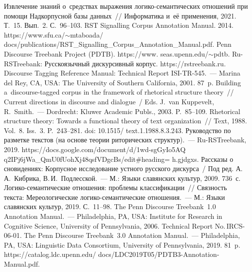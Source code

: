 \begin{multicols}{2}
{\small\frenchspacing
 { %
 \begin{thebibliography}{99}
 
\vspace*{-2pt}
 
 Извлечение знаний о~средствах выражения 
ло\-ги\-ко-се\-ман\-ти\-че\-ских отношений при помощи Надкорпусной базы данных~// Информатика и~её 
применения, 2021. Т.~15. Вып.~2. С.~96--103.
 RST Signalling Corpus Annotation Manual. 2014. {\sf 
https://www.sfu.ca/$\sim$mtaboada/ docs/publications/RST\_Signalling\_Corpus\_Annotation\_\linebreak Manual.pdf}.
Penn Discourse Treebank Project (PDTB). {\sf https://www. seas.upenn.edu/$\sim$pdtb}.
Ru-RSTreebank: Русскоязычный дискурсивный корпус. {\sf https://rstreebank.ru}.
 Discourse Tagging Reference Manual: Technical Report ISI-TR-545.~--- 
Marina del Rey, CA, USA: The University of Southern California, 2001. 87~p.
 Building a~discourse-tagged corpus in the framework 
of rhetorical structure theory~// Current directions in discourse and dialogue~/ Eds. J.~van Kuppevelt, 
R.~Smith.~--- Dordrecht: Kluwer Academic Publs., 2003. P.~85--109.
 Rhetorical structure theory: Towards a functional theory of text 
organization~// Text, 1988. Vol.~8. Iss.~3. P.~243--281. doi: 10.1515/ text.1.1988.8.3.243.
Руководство по разметке текстов (на основе тео\-рии риторических структур).~--- Ru-RSTreebank, 
2019.   
{\sf https://docs.google.com/document/d/1wd-sgGyIo5AQ q2IPj6jWa\_QmU0fUohXj48qsfVDgcBs/edit\#heading= h.gjdgxs}. 
Рассказы о сновидениях: Корпусное исследование устного русского дискурса~/ Под ред. 
А.\,А.~Кибрика, В.\,И.~Подлесской.~--- М.: Языки славянских культур, 2009. 736~с.
 Логико-се\-ман\-ти\-че\-ские отношения: проб\-ле\-мы клас\-си\-фи\-ка\-ции~// 
Связность текста: Мереологические  
ло\-ги\-ко-се\-ман\-ти\-че\-ские отношения.~--- М.: Языки славянских культур, 2019. С.~11--98.
 The Penn Discourse 
Treebank~1.0 Annotation Manual.~--- Philadelphia, PA, USA: 
Institute for Research in Cognitive Science, University of Pennsylvania, 2006. Technical Report No.\,IRCS-06-01.
 The Penn Discourse Treebank~3.0 Annotation 
Manual.~--- Philadelphia, PA, USA: Linguistic Data Consortium, University of Pennsylvania, 2019. 
81~p. %
{\sf 
https://catalog.ldc.upenn.edu/ docs/LDC2019T05/PDTB3-Annotation-Manual.pdf}.


\end{thebibliography}}}
\end{multicols}

